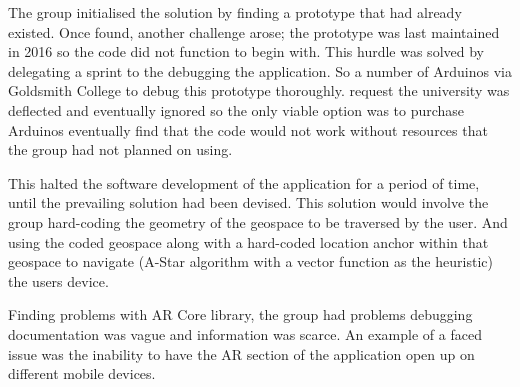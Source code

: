 The group initialised the solution by finding a prototype that had already existed.  Once found, another challenge arose; the prototype was last maintained in 2016 so the code did not function to begin with. This hurdle was solved by delegating a sprint to the debugging the application. So a number of Arduinos via Goldsmith College to debug this prototype thoroughly.  request  the university was deflected and eventually ignored so the only viable option was to purchase Arduinos  eventually find that the code would not work without resources that the group had not planned on using. 

This halted the software development of the application for a period of time, until the prevailing solution had been devised. This solution would involve the group hard-coding the geometry of the geospace to be traversed by the user. And using the coded geospace along with a hard-coded location anchor within that geospace to navigate (A-Star algorithm with a vector function as the heuristic) the users device.

 Finding problems with AR Core library, the group had problems debugging  documentation was vague and information was scarce. An example of a faced issue was the inability to have the AR section of the application open up on different mobile devices. 


